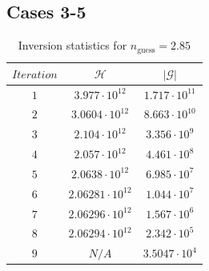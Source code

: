 \documentclass[12pt]{article}
\begin{document}
\subsection{Cases 3-5}
\begin{table}[H]
		\caption{Inversion statistics for $n_{\text{guess}}= 2.85$} %
		\centering  %
		\begin{tabular}{c c c } %
		\hline \hline                        %
 		$Iteration$&$\mathcal H$ &$|\mathcal G|$   \\ [0.5ex] %
		\hline                  %
                $1$&$3.977\cdot 10^{12}$&$1.717\cdot 10^{11}$   \\
		$2$&$3.0604\cdot 10^{12}$&$8.663\cdot 10^{10}$   \\
                $3$&$2.104\cdot 10^{12}$&$3.356\cdot 10^{9}$   \\
		$4$&$2.057\cdot 10^{12}$&$4.461\cdot 10^{8}$   \\
		$5$&$2.0638\cdot 10^{12}$&$6.985\cdot 10^{7}$   \\
		$6$&$2.06281\cdot 10^{12}$&$1.044\cdot 10^{7}$   \\
		$7$&$2.06296\cdot 10^{12}$&$1.567\cdot 10^{6}$   \\
 		$8$&$2.06294\cdot 10^{12}$&$2.342\cdot 10^{5}$   \\
		$9$&$N/A$&$3.5047\cdot 10^{4}$   \\

                \hline %
		\end{tabular}
		\label{table:gradcheck3} %
		\end{table}
 
\end{document}
